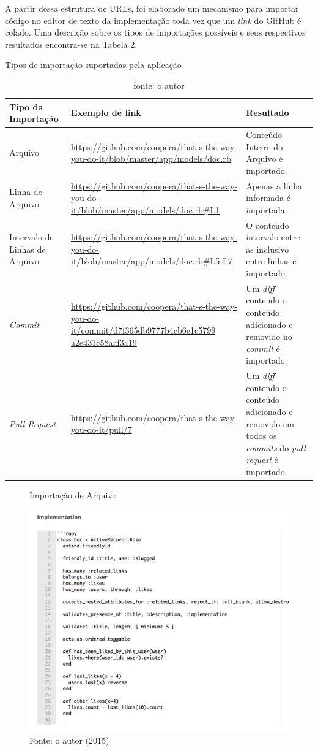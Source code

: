 A partir dessa estrutura de URLs, foi elaborado um mecanismo para importar código no editor de texto da implementação toda vez que um \textit{link} do GitHub é colado. Uma descrição sobre os tipos de importações possíveis e seus respectivos resultados encontra-se na Tabela 2.

\begin{table}[]
\centering
    \caption{Tipos de importação suportadas pela aplicação}
    \label{my-label}
    \begin{tabular}{p{3cm} | p{7cm} | p{5cm}}
    \hline
    Tipo da Importação & Exemplo de link & Resultado \\ \hline
    Arquivo & \url{https://github.com/coopera/that-s-the-way-you-do-it/blob/master/app/models/doc.rb} & Conteúdo Inteiro do Arquivo é importado. \\ \hline
    Linha de Arquivo & \url{https://github.com/coopera/that-s-the-way-you-do-it/blob/master/app/models/doc.rb\#L1} & Apenas a linha informada é importada. \\ \hline
    Intervalo de Linhas de Arquivo & \url{https://github.com/coopera/that-s-the-way-you-do-it/blob/master/app/models/doc.rb\#L5-L7} & O conteúdo intervalo entre as inclusivo entre linhas é importado. \\ \hline
    \textit{Commit} & \url{https://github.com/coopera/that-s-the-way-you-do-it/commit/d7f365db9777b4cb6e1c5799}
    \url{a2e431c58aaf3a19} & Um \textit{diff} contendo o conteúdo adicionado e removido no \textit{commit} é importado. \\ \hline
    \textit{Pull Request} & \url{https://github.com/coopera/that-s-the-way-you-do-it/pull/7} & Um \textit{diff} contendo o conteúdo adicionado e removido em todos os \textit{commits} do \textit{pull request} é importado.  \\ \hline
\end{tabular}
\caption*{fonte: o autor}
\end{table}

\begin{figure}[h]
	\centering
    \caption{Importação de Arquivo}
    \includegraphics[width=15cm]{Imagens/import-file.png}
	\caption*{Fonte: o autor (2015)}
\end{figure}

